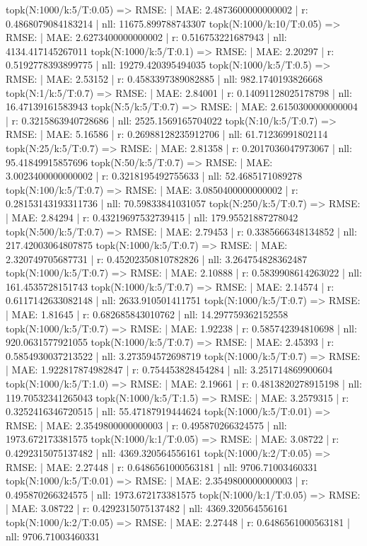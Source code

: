 topk(N:1000/k:5/T:0.05) => RMSE: | MAE: 2.4873600000000002 | r: 0.4868079084183214 | nll: 11675.899788743307
topk(N:1000/k:10/T:0.05) => RMSE: | MAE: 2.6273400000000002 | r: 0.516753221687943 | nll: 4134.417145267011
topk(N:1000/k:5/T:0.1) => RMSE: | MAE: 2.20297 | r: 0.5192778393899775 | nll: 19279.420395494035
topk(N:1000/k:5/T:0.5) => RMSE: | MAE: 2.53152 | r: 0.4583397389082885 | nll: 982.1740193826668
topk(N:1/k:5/T:0.7) => RMSE: | MAE: 2.84001 | r: 0.14091128025178798 | nll: 16.47139161583943
topk(N:5/k:5/T:0.7) => RMSE: | MAE: 2.6150300000000004 | r: 0.3215863940728686 | nll: 2525.1569165704022
topk(N:10/k:5/T:0.7) => RMSE: | MAE: 5.16586 | r: 0.26988128235912706 | nll: 61.71236991802114
topk(N:25/k:5/T:0.7) => RMSE: | MAE: 2.81358 | r: 0.2017036047973067 | nll: 95.41849915857696
topk(N:50/k:5/T:0.7) => RMSE: | MAE: 3.0023400000000002 | r: 0.3218195492755633 | nll: 52.4685171089278
topk(N:100/k:5/T:0.7) => RMSE: | MAE: 3.0850400000000002 | r: 0.28153143193311736 | nll: 70.59833841031057
topk(N:250/k:5/T:0.7) => RMSE: | MAE: 2.84294 | r: 0.43219697532739415 | nll: 179.95521887278042
topk(N:500/k:5/T:0.7) => RMSE: | MAE: 2.79453 | r: 0.3385666348134852 | nll: 217.42003064807875
topk(N:1000/k:5/T:0.7) => RMSE: | MAE: 2.320749705687731 | r: 0.45202350810782826 | nll: 3.264754828362487
topk(N:1000/k:5/T:0.7) => RMSE: | MAE: 2.10888 | r: 0.5839908614263022 | nll: 161.4535728151743
topk(N:1000/k:5/T:0.7) => RMSE: | MAE: 2.14574 | r: 0.6117142633082148 | nll: 2633.910501411751
topk(N:1000/k:5/T:0.7) => RMSE: | MAE: 1.81645 | r: 0.682685843010762 | nll: 14.297759362152558
topk(N:1000/k:5/T:0.7) => RMSE: | MAE: 1.92238 | r: 0.585742394810698 | nll: 920.0631577921055
topk(N:1000/k:5/T:0.7) => RMSE: | MAE: 2.45393 | r: 0.5854930037213522 | nll: 3.273594572698719
topk(N:1000/k:5/T:0.7) => RMSE: | MAE: 1.922817874982847 | r: 0.754453828454284 | nll: 3.251714869900604
topk(N:1000/k:5/T:1.0) => RMSE: | MAE: 2.19661 | r: 0.4813820278915198 | nll: 119.70532341265043
topk(N:1000/k:5/T:1.5) => RMSE: | MAE: 3.2579315 | r: 0.3252416346720515 | nll: 55.47187919444624
topk(N:1000/k:5/T:0.01) => RMSE: | MAE: 2.3549800000000003 | r: 0.495870266324575 | nll: 1973.672173381575
topk(N:1000/k:1/T:0.05) => RMSE: | MAE: 3.08722 | r: 0.4292315075137482 | nll: 4369.320564556161
topk(N:1000/k:2/T:0.05) => RMSE: | MAE: 2.27448 | r: 0.6486561000563181 | nll: 9706.71003460331
topk(N:1000/k:5/T:0.01) => RMSE: | MAE: 2.3549800000000003 | r: 0.495870266324575 | nll: 1973.672173381575
topk(N:1000/k:1/T:0.05) => RMSE: | MAE: 3.08722 | r: 0.4292315075137482 | nll: 4369.320564556161
topk(N:1000/k:2/T:0.05) => RMSE: | MAE: 2.27448 | r: 0.6486561000563181 | nll: 9706.71003460331
